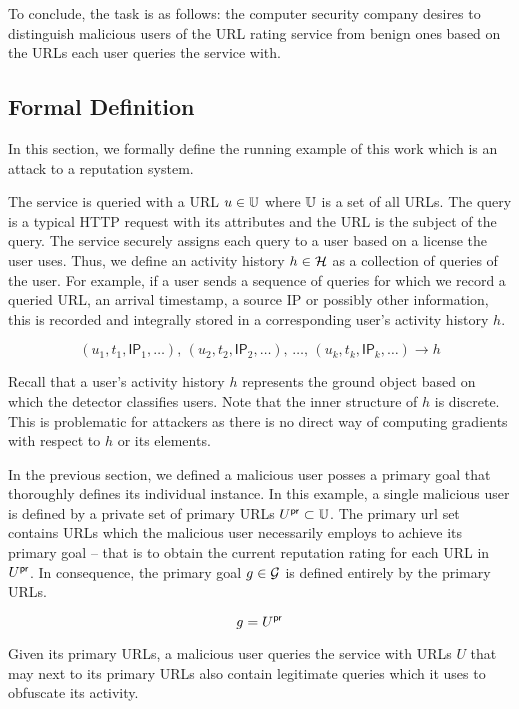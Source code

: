 To conclude, the task is as follows: the computer security company desires to
distinguish malicious users of the URL rating service from benign ones based on the URLs each user queries the service with.

\subsection{Formal Definition}\label{sec:formal_definition}
In this section, we formally define the running example of this work which is an attack to a reputation system.

The service is queried with a URL $u \in \mathbb{U}$ where $\mathbb{U}$ is a set of all URLs. The query is a typical HTTP request with its attributes and the URL is the subject of the query. The service securely assigns each query to a user based on a license the user uses. Thus, we define an activity history $h \in \mathcal{H}$ as a collection of queries of the user. For example, if a user sends a sequence of queries for which we record a queried URL, an arrival timestamp, a source IP or possibly other information, this is recorded and integrally stored in a corresponding user’s activity history $h$.

\begin{equation}
(u_1, t_1, \mathsf{IP}_1, \dots), \, (u_2, t_2, \mathsf{IP}_2, \dots), \, \dots, \, (u_k, t_k, \mathsf{IP}_k, \dots) \longrightarrow h
\end{equation}

Recall that a user's activity history $h$ represents the ground object based on which the detector classifies users. Note that the inner structure of $h$ is discrete. This is problematic for attackers as there is no direct way of computing gradients with respect to $h$ or its elements.

In the previous section, we defined a malicious user posses a primary goal that thoroughly defines its individual instance. In this example, a single malicious user is defined by a private set of primary URLs $U^{\mathsf{pr}} \subset \mathbb{U}$. The primary url set contains URLs which the malicious user necessarily employs to achieve its primary goal – that is to obtain the current reputation rating for each URL in $U^{\mathsf{pr}}$. In consequence, the primary goal $g \in \mathcal{G}$ is defined entirely by the primary URLs.

\begin{equation}
    g = U^{\mathsf{pr}}
\end{equation}

Given its primary URLs, a malicious user queries the service with URLs $U$ that may next to its primary URLs also contain legitimate queries which it uses to
obfuscate its activity.


